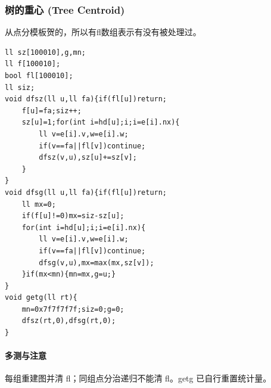 \subsubsection{树的重心 (Tree Centroid)}
从点分模板贺的，所以有fl数组表示有没有被处理过。
\begin{lstlisting}
ll sz[100010],g,mn;
ll f[100010];
bool fl[100010];
ll siz;
void dfsz(ll u,ll fa){if(fl[u])return;
	f[u]=fa;siz++;
	sz[u]=1;for(int i=hd[u];i;i=e[i].nx){
		ll v=e[i].v,w=e[i].w;
		if(v==fa||fl[v])continue;
		dfsz(v,u),sz[u]+=sz[v];
	}
}
void dfsg(ll u,ll fa){if(fl[u])return;
	ll mx=0;
	if(f[u]!=0)mx=siz-sz[u];
	for(int i=hd[u];i;i=e[i].nx){
		ll v=e[i].v,w=e[i].w;
		if(v==fa||fl[v])continue;
		dfsg(v,u),mx=max(mx,sz[v]);
	}if(mx<mn){mn=mx,g=u;}
}
void getg(ll rt){
	mn=0x7f7f7f7f;siz=0;g=0;
	dfsz(rt,0),dfsg(rt,0);
}
\end{lstlisting}

\paragraph{多测与注意} 每组重建图并清 fl；同组点分治递归不能清 fl。getg 已自行重置统计量。
